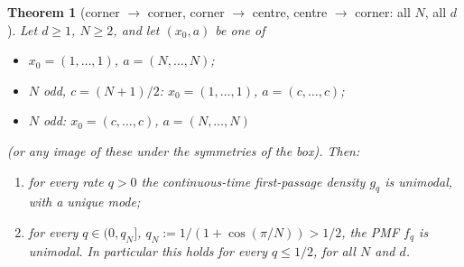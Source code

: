\documentclass[11pt,a4paper]{article}
\newtheorem{theorem}{Theorem}[section]
\theoremstyle{definition}
\begin{document}
\begin{theorem}[corner $\to$ corner, corner $\to$ centre, centre $\to$ corner: all $N$, all $d$]\label{thm:main}
Let $d\ge1$, $N\ge2$, and let $(x_0,a)$ be one of
\begin{itemize}
\item[(CC)] $x_0=(1,\dots,1)$, $a=(N,\dots,N)$;
\item[(C2M)] $N$ odd, $c=(N+1)/2$: $x_0=(1,\dots,1)$, $a=(c,\dots,c)$;
\item[(M2C)] $N$ odd: $x_0=(c,\dots,c)$, $a=(N,\dots,N)$
\end{itemize}
(or any image of these under the symmetries of the box). Then:
\begin{enumerate}
\item[(i)] for every rate $q>0$ the continuous-time first-passage density $g_q$ is unimodal, with a unique mode;
\item[(ii)] for every $q\in(0,q_N]$, $q_N:=1/(1+\cos(\pi/N))>1/2$, the PMF $f_q$ is unimodal. In particular this holds for every $q\le1/2$, for all $N$ and $d$.
\end{enumerate}
\end{theorem}
\end{document}
